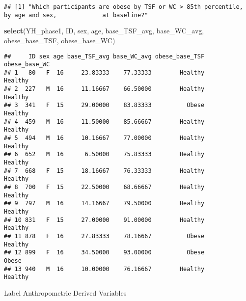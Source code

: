 \documentclass[]{article}
\newenvironment{Shaded}{\begin{snugshade}}{\end{snugshade}}
\newcommand{\KeywordTok}[1]{\textcolor[rgb]{0.13,0.29,0.53}{\textbf{#1}}}
\newcommand{\NormalTok}[1]{#1}
\begin{document}
\begin{verbatim}
## [1] "Which participants are obese by TSF or WC > 85th percentile, by age and sex,             at baseline?"
\end{verbatim}

\begin{Shaded}
\begin{Highlighting}[]
    \KeywordTok{select}\NormalTok{(YH_phase1, ID, sex, age, base_TSF_avg, base_WC_avg, obese_base_TSF, obese_base_WC)}
\end{Highlighting}
\end{Shaded}

\begin{verbatim}
##     ID sex age base_TSF_avg base_WC_avg obese_base_TSF obese_base_WC
## 1   80   F  16     23.83333    77.33333        Healthy       Healthy
## 2  227   M  16     11.16667    66.50000        Healthy       Healthy
## 3  341   F  15     29.00000    83.83333          Obese       Healthy
## 4  459   M  16     11.50000    85.66667        Healthy       Healthy
## 5  494   M  16     10.16667    77.00000        Healthy       Healthy
## 6  652   M  16      6.50000    75.83333        Healthy       Healthy
## 7  668   F  15     18.16667    76.33333        Healthy       Healthy
## 8  700   F  15     22.50000    68.66667        Healthy       Healthy
## 9  797   M  16     14.16667    79.50000        Healthy       Healthy
## 10 831   F  15     27.00000    91.00000        Healthy       Healthy
## 11 878   F  16     27.83333    78.16667          Obese       Healthy
## 12 899   F  16     34.50000    93.00000          Obese         Obese
## 13 940   M  16     10.00000    76.16667        Healthy       Healthy
\end{verbatim}

Label Anthropometric Derived Variables
\end{document}

